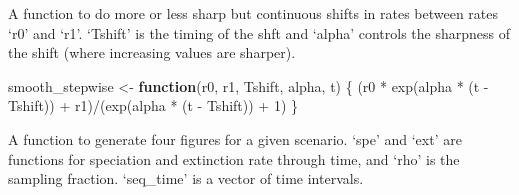\documentclass[
]{article}
\newenvironment{Shaded}{\begin{snugshade}}{\end{snugshade}}
\newcommand{\ControlFlowTok}[1]{\textcolor[rgb]{0.13,0.29,0.53}{\textbf{#1}}}
\newcommand{\DecValTok}[1]{\textcolor[rgb]{0.00,0.00,0.81}{#1}}
\newcommand{\FunctionTok}[1]{\textcolor[rgb]{0.00,0.00,0.00}{#1}}
\newcommand{\NormalTok}[1]{#1}
\newcommand{\OtherTok}[1]{\textcolor[rgb]{0.56,0.35,0.01}{#1}}
\newcommand{\SpecialCharTok}[1]{\textcolor[rgb]{0.00,0.00,0.00}{#1}}
\begin{document}
A function to do more or less sharp but continuous shifts in rates
between rates `r0' and `r1'. `Tshift' is the timing of the shft and
`alpha' controls the sharpness of the shift (where increasing values are
sharper).

\begin{Shaded}
\begin{Highlighting}[]
\NormalTok{smooth\_stepwise }\OtherTok{\textless{}{-}} \ControlFlowTok{function}\NormalTok{(r0, r1, Tshift, alpha, t) \{}
\NormalTok{    (r0 }\SpecialCharTok{*} \FunctionTok{exp}\NormalTok{(alpha }\SpecialCharTok{*}\NormalTok{ (t }\SpecialCharTok{{-}}\NormalTok{ Tshift)) }\SpecialCharTok{+}\NormalTok{ r1)}\SpecialCharTok{/}\NormalTok{(}\FunctionTok{exp}\NormalTok{(alpha }\SpecialCharTok{*}\NormalTok{ (t }\SpecialCharTok{{-}}\NormalTok{ Tshift)) }\SpecialCharTok{+}
        \DecValTok{1}\NormalTok{)}
\NormalTok{\}}
\end{Highlighting}
\end{Shaded}

\pagebreak

A function to generate four figures for a given scenario. `spe' and
`ext' are functions for speciation and extinction rate through time, and
`rho' is the sampling fraction. `seq\_time' is a vector of time
intervals.
\end{document}
